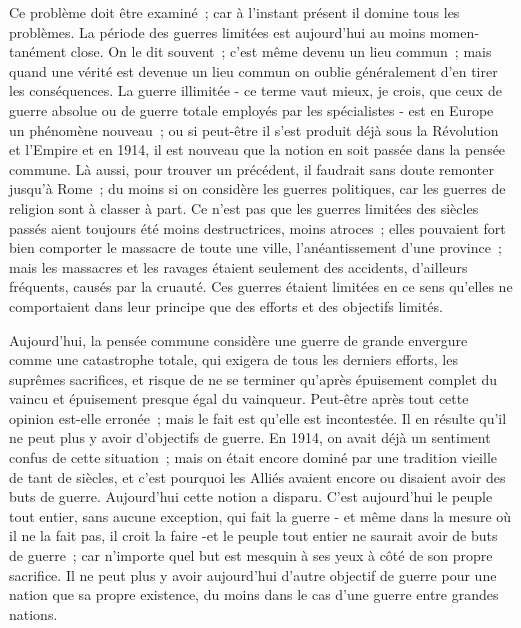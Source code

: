 \documentclass[french,twoside]{book} %
\begin{document}
Ce problème doit être examiné ; car à l'instant présent il domine tous les problèmes. La période des guerres limitées est aujourd'hui au moins momen­tanément close. On le dit souvent ; c'est même devenu un lieu commun ; mais quand une vérité est devenue un lieu commun on oublie généralement d'en tirer les conséquences. La guerre illimitée - ce terme vaut mieux, je crois, que ceux de guerre absolue ou de guerre totale employés par les spécialistes - est en Europe un phénomène nouveau ; ou si peut-être il s'est produit déjà sous la Révolution et l'Empire et en 1914, il est nouveau que la notion en soit passée dans la pensée commune. Là aussi, pour trouver un précédent, il faudrait sans doute remonter jusqu'à Rome ; du moins si on considère les guerres politiques, car les guerres de religion sont à classer à part. Ce n'est pas que les guerres limitées des siècles passés aient toujours été moins destructrices, moins atroces ; elles pouvaient fort bien comporter le massacre de toute une ville, l'anéantissement d'une province ; mais les massacres et les ravages étaient seulement des accidents, d'ailleurs fréquents, causés par la cruauté. Ces guer­res étaient limitées en ce sens qu'elles ne comportaient dans leur principe que des efforts et des objectifs limités.\par
Aujourd'hui, la pensée commune considère une guerre de grande enver­gure comme une catastrophe totale, qui exigera de tous les derniers efforts, les suprêmes sacrifices, et risque de ne se terminer qu'après épuisement complet du vaincu et épuisement presque égal du vainqueur. Peut-être après tout cette opinion est-elle erronée ; mais le fait est qu'elle est incontestée. Il en résulte qu'il ne peut plus y avoir d'objectifs de guerre. En 1914, on avait déjà un sentiment confus de cette situation ; mais on était encore dominé par une tradition vieille de tant de siècles, et c'est pourquoi les Alliés avaient encore ou disaient avoir des buts de guerre. Aujourd'hui cette notion a disparu. C'est aujourd'hui le peuple tout entier, sans aucune exception, qui fait la guerre - et même dans la mesure où il ne la fait pas, il croit la faire -et le peuple tout entier ne saurait avoir de buts de guerre ; car n'importe quel but est mesquin à ses yeux à côté de son propre sacrifice. Il ne peut plus y avoir aujourd'hui d'autre objectif de guerre pour une nation que sa propre existence, du moins dans le cas d'une guerre entre grandes nations.\par
\end{document}
